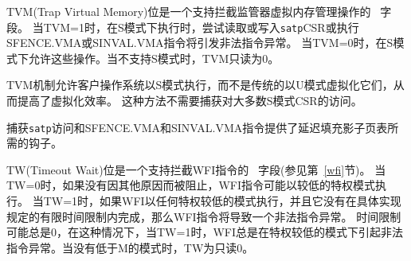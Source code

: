 \iffalse
The TVM (Trap Virtual Memory) bit is a \warl\ field that supports intercepting
supervisor virtual-memory management operations.  When TVM=1,
attempts to read or write the {\tt satp} CSR or execute an SFENCE.VMA or
SINVAL.VMA instruction while executing in S-mode will raise an illegal instruction
exception.  When TVM=0, these operations are permitted in S-mode.
TVM is read-only 0 when S-mode is not supported.
\fi

TVM(Trap Virtual Memory)位是一个支持拦截监管器虚拟内存管理操作的 \warl\ 字段。
当TVM=1时，在S模式下执行时，尝试读取或写入{\tt satp}CSR或执行SFENCE.VMA或SINVAL.VMA指令将引发非法指令异常。
当TVM=0时，在S模式下允许这些操作。当不支持S模式时，TVM只读为0。

\iffalse
\begin{commentary}
The TVM mechanism improves virtualization efficiency by permitting guest
operating systems to execute in S-mode, rather than classically virtualizing
them in U-mode.  This approach obviates the need to trap accesses to most
S-mode CSRs.

Trapping {\tt satp} accesses and the SFENCE.VMA and SINVAL.VMA instructions
provides the hooks necessary to lazily populate shadow page tables.
\end{commentary}
\fi

\begin{commentary}
TVM机制允许客户操作系统以S模式执行，而不是传统的以U模式虚拟化它们，从而提高了虚拟化效率。
这种方法不需要捕获对大多数S模式CSR的访问。

捕获{\tt satp}访问和SFENCE.VMA和SINVAL.VMA指令提供了延迟填充影子页表所需的钩子。
\end{commentary}

\iffalse
The TW (Timeout Wait) bit is a \warl\ field that supports intercepting the WFI
instruction (see Section~\ref{wfi}).
When TW=0, the WFI instruction may execute in lower
privilege modes when not prevented for some other reason.  When TW=1,
then if WFI is executed in any less-privileged mode, and it does not complete
within an implementation-specific, bounded time limit, the WFI instruction
causes an illegal instruction exception.  The time limit may always be 0, in which
case WFI always causes an illegal instruction exception in less-privileged modes
when TW=1.  TW is read-only 0 when there are no modes less privileged than
M.
\fi

TW(Timeout Wait)位是一个支持拦截WFI指令的 \warl\ 字段(参见第~\ref{wfi}节)。
当TW=0时，如果没有因其他原因而被阻止，WFI指令可能以较低的特权模式执行。
当TW=1时，如果WFI以任何特权较低的模式执行，并且它没有在具体实现规定的有限时间限制内完成，那么WFI指令将导致一个非法指令异常。
时间限制可能总是0，在这种情况下，当TW=1时，WFI总是在特权较低的模式下引起非法指令异常。当没有低于M的模式时，TW为只读0。

